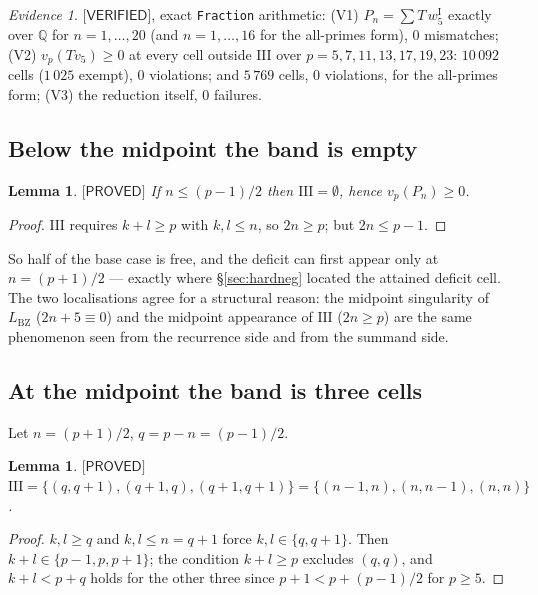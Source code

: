 \documentclass[11pt,reqno]{amsart}
\theoremstyle{plain}
\newtheorem{lemma}[theorem]{Lemma}
\theoremstyle{definition}
\theoremstyle{remark}
\newtheorem{evidence}[theorem]{Evidence}
\numberwithin{equation}{section}
\newcommand{\QQ}{\mathbb{Q}}
\newcommand{\LBZ}{L_{\mathrm{BZ}}}
\newcommand{\vfive}{v_5}
\newcommand{\PROVED}{\textsf{[PROVED]}}
\newcommand{\VERIFIED}{\textsf{[VERIFIED]}}
\begin{document}
\begin{evidence}\label{ev:oneband}
$\VERIFIED$, exact \texttt{Fraction} arithmetic: (V1) $P_n=\sum T\,w_5^{\mathrm I}$ exactly over
$\QQ$ for $n=1,\dots,20$ (and $n=1,\dots,16$ for the all-primes form), $0$ mismatches;
(V2) $v_p(T\vfive)\ge0$ at every cell outside $\mathrm{III}$ over
$p=5,7,11,13,17,19,23$: $10\,092$ cells ($1\,025$ exempt), $0$ violations; and $5\,769$ cells,
$0$ violations, for the all-primes form; (V3) the reduction itself, $0$ failures.
\end{evidence}

\subsection{Below the midpoint the band is empty}

\begin{lemma}\label{lem:below}
$\PROVED$ If $n\le(p-1)/2$ then $\mathrm{III}=\emptyset$, hence $v_p(P_n)\ge0$.
\end{lemma}

\begin{proof}
$\mathrm{III}$ requires $k+l\ge p$ with $k,l\le n$, so $2n\ge p$; but $2n\le p-1$.
\end{proof}

So half of the base case is free, and the deficit can first appear only at $n=(p+1)/2$ ---
exactly where \S\ref{sec:hardneg} located the attained deficit cell. The two localisations
agree for a structural reason: the midpoint singularity of $\LBZ$ ($2n+5\equiv0$) and the
midpoint appearance of $\mathrm{III}$ ($2n\ge p$) are the same phenomenon seen from the
recurrence side and from the summand side.

\subsection{At the midpoint the band is three cells}

Let $n=(p+1)/2$, $q=p-n=(p-1)/2$.

\begin{lemma}\label{lem:threecells}
$\PROVED$ $\mathrm{III}=\{(q,q+1),(q+1,q),(q+1,q+1)\}=\{(n-1,n),(n,n-1),(n,n)\}$.
\end{lemma}

\begin{proof}
$k,l\ge q$ and $k,l\le n=q+1$ force $k,l\in\{q,q+1\}$. Then $k+l\in\{p-1,p,p+1\}$; the
condition $k+l\ge p$ excludes $(q,q)$, and $k+l<p+q$ holds for the other three since
$p+1<p+(p-1)/2$ for $p\ge5$.
\end{proof}
\end{document}
